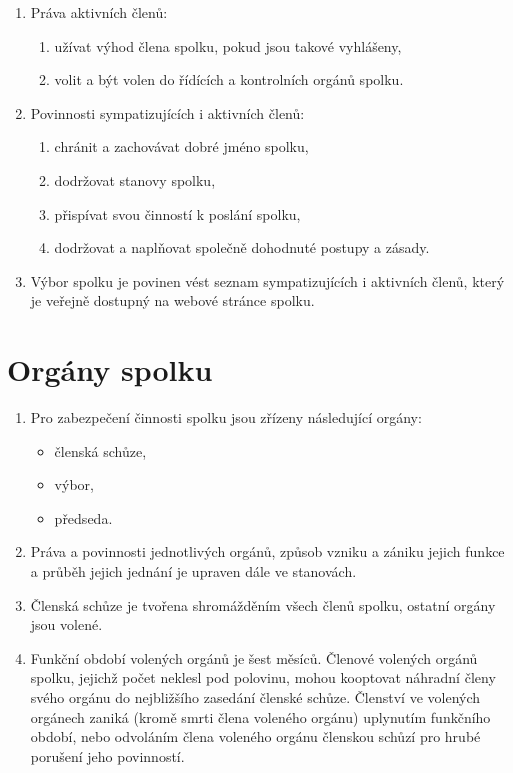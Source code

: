 \documentclass[11pt]{article}
\begin{document}
\begin{enumerate}
\begin{enumerate}
\end{enumerate}
\item Práva aktivních členů:
\begin{enumerate}
\item užívat výhod člena spolku, pokud jsou takové vyhlášeny,
\item volit a být volen do řídících a kontrolních orgánů spolku.
\end{enumerate}
\item Povinnosti sympatizujících i aktivních členů:
\begin{enumerate}
\item chránit a zachovávat dobré jméno spolku,
\item dodržovat stanovy spolku,
\item přispívat svou činností k poslání spolku,
\item dodržovat a naplňovat společně dohodnuté postupy a zásady.
\end{enumerate}
\item Výbor spolku je povinen vést seznam sympatizujících i aktivních členů, který je veřejně dostupný na webové stránce spolku. 
\end{enumerate}

\section{Orgány spolku}
\begin{enumerate}
\item  Pro zabezpečení činnosti spolku jsou zřízeny následující orgány: 
\begin{itemize}
\item členská schůze,
\item výbor,
\item předseda.
\end{itemize}
\item Práva a povinnosti jednotlivých orgánů, způsob vzniku a zániku jejich funkce a průběh jejich jednání je upraven dále ve stanovách.
\item Členská schůze je tvořena shromážděním všech členů spolku, ostatní orgány jsou volené.
\item Funkční období volených orgánů je šest měsíců. Členové volených orgánů spolku, jejichž počet neklesl pod polovinu, mohou kooptovat náhradní členy svého orgánu do nejbližšího zasedání členské schůze. Členství ve volených orgánech zaniká (kromě smrti člena voleného orgánu) uplynutím funkčního období, nebo odvoláním člena voleného orgánu členskou schůzí pro hrubé porušení jeho povinností.
\end{enumerate}
\end{document}
